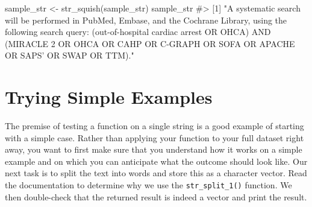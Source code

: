 \documentclass[
  letterpaper,
]{latex/krantz}
\makeatletter
\newenvironment{Shaded}{\begin{snugshade}}{\end{snugshade}}
\newcommand{\CommentTok}[1]{\textcolor[rgb]{0.37,0.37,0.37}{#1}}
\newcommand{\FunctionTok}[1]{\textcolor[rgb]{0.28,0.35,0.67}{#1}}
\newcommand{\NormalTok}[1]{\textcolor[rgb]{0.00,0.23,0.31}{#1}}
\newcommand{\OtherTok}[1]{\textcolor[rgb]{0.00,0.23,0.31}{#1}}
\newenvironment{kframe}{%
\medskip{}
\setlength{\fboxsep}{.8em}
 \def\at@end@of@kframe{}%
 \ifinner\ifhmode%
  \def\at@end@of@kframe{\end{minipage}}%
  \begin{minipage}{\columnwidth}%
 \fi\fi%
 \def\FrameCommand##1{\hskip\@totalleftmargin \hskip-\fboxsep
 \colorbox{shadecolor}{##1}\hskip-\fboxsep
     \hskip-\linewidth \hskip-\@totalleftmargin \hskip\columnwidth}%
 \MakeFramed {\advance\hsize-\width
   \@totalleftmargin\z@ \linewidth\hsize
   \@setminipage}}%
 {\par\unskip\endMakeFramed%
 \at@end@of@kframe}
\renewenvironment{Shaded}{\begin{kframe}}{\end{kframe}}
\makeatother
\begin{document}
\begin{Shaded}
\begin{Highlighting}[]
\NormalTok{sample\_str }\OtherTok{\textless{}{-}} \FunctionTok{str\_squish}\NormalTok{(sample\_str)}
\NormalTok{sample\_str}
\CommentTok{\#\textgreater{} [1] "A systematic search will be performed in PubMed, Embase, and the Cochrane Library, using the following search query: (\textquotesingle{}out{-}of{-}hospital cardiac arrest\textquotesingle{} OR \textquotesingle{}OHCA\textquotesingle{}) AND (\textquotesingle{}MIRACLE 2\textquotesingle{} OR \textquotesingle{}OHCA\textquotesingle{} OR \textquotesingle{}CAHP\textquotesingle{} OR \textquotesingle{}C{-}GRAPH\textquotesingle{} OR \textquotesingle{}SOFA\textquotesingle{} OR \textquotesingle{}APACHE\textquotesingle{} OR \textquotesingle{}SAPS’ OR \textquotesingle{}SWAP\textquotesingle{} OR \textquotesingle{}TTM\textquotesingle{})."}
\end{Highlighting}
\end{Shaded}

\section{Trying Simple Examples}\label{trying-simple-examples}

The premise of testing a function on a single string is a good example
of starting with a simple case. Rather than applying your function to
your full dataset right away, you want to first make sure that you
understand how it works on a simple example and on which you can
anticipate what the outcome should look like. Our next task is to split
the text into words and store this as a character vector. Read the
documentation to determine why we use the
\texttt{str\_split\_1()}
function. We then double-check that the returned result is indeed a
vector and print the result.
\end{document}
